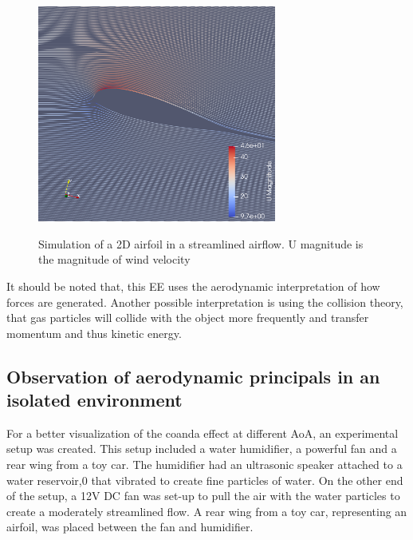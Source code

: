 \documentclass[11pt, a4paper]{article}
\begin{document}
\begin{figure}[H]
    \caption{Simulation of a 2D airfoil in a streamlined airflow. U magnitude is the magnitude of wind velocity} 
    \centering 
    \includegraphics[width=0.7\textwidth]{images/cfd/TearDrop_velocity.png}
~\label{fig:teardropV}
\end{figure}


It should be noted that, this EE uses the aerodynamic interpretation of how forces are generated. Another possible interpretation is using the collision theory, that gas particles will collide with the object more frequently and transfer momentum and thus kinetic energy.
\subsection{Observation of aerodynamic principals in an isolated environment}
For a better visualization of the coanda effect at different AoA, an experimental setup was created. This setup included a water humidifier, a powerful fan and a rear wing from a toy car. The humidifier had an ultrasonic speaker attached to a water reservoir,0 that vibrated to create fine particles of water.
On the other end of the setup, a 12V DC fan was set-up to pull the air with the water particles to create a moderately streamlined flow. A rear wing from a toy car, representing an airfoil, was placed between the fan and humidifier.
\end{document}
